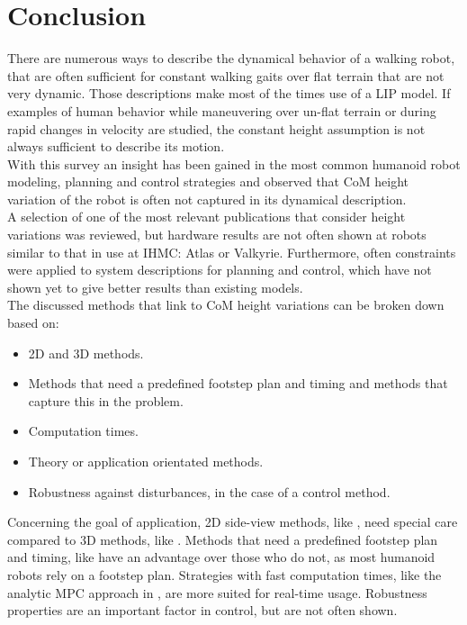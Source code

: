 %
\chapter{Conclusion}%
\label{chap:conclusion}
There are numerous ways to describe the dynamical behavior of a walking robot, that are often sufficient for constant walking gaits over flat terrain that are not very dynamic. Those descriptions make most of the times use of a \ac{LIP} model. If examples of human behavior while maneuvering over un-flat terrain or during rapid changes in velocity are studied, the constant height assumption is not always sufficient to describe its motion. \\
With this survey an insight has been gained in the most common humanoid robot modeling, planning and control strategies and observed that \ac{CoM} height variation of the robot is often not captured in its dynamical description.\\
A selection of one of the most relevant publications that consider height variations was reviewed, but hardware results are not often shown at robots similar to that in use at IHMC: Atlas or Valkyrie. Furthermore, often constraints were applied to system descriptions for planning and control, which have not shown yet to give better results than existing models.\\
The discussed methods that link to \ac{CoM} height variations can be broken down based on:
\begin{itemize}
\item \ac{2D} and \ac{3D} methods.
\item Methods that need a predefined footstep plan and timing and methods that capture this in the problem.
\item Computation times.
\item Theory or application orientated methods.
\item Robustness against disturbances, in the case of a control method.
\end{itemize}
Concerning the goal of application, \ac{2D} side-view methods, like \cite{pratt2007derivation, koolen2016balance, gao2017increase, nguyen2017dynamic}, need special care compared to \ac{3D} methods, like \cite{englsberger2013three, hopkins2014humanoid, liu2015trajectory, caron2018capturability}. Methods that need a predefined footstep plan and timing, like  \cite{englsberger2013three, hopkins2014humanoid,  caron2018capturability} have an advantage over those who do not, as most humanoid robots rely on a footstep plan. Strategies with fast computation times, like the analytic \ac{MPC} approach in \cite{koolen2016balance}, are more suited for real-time usage. Robustness properties are an important factor in control, but are not often shown.\\

